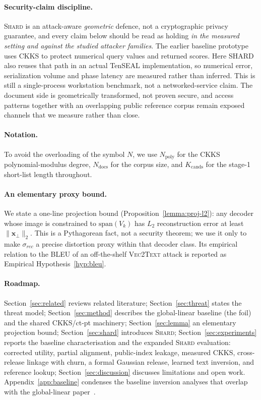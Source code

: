 \paragraph{Security-claim discipline.} \textsc{Shard} is an attack-aware
\emph{geometric} defence, not a cryptographic privacy guarantee, and every
claim below should be read as holding \emph{in the measured setting and
against the studied attacker families}. The earlier baseline prototype uses
CKKS to protect numerical query values and returned scores. Here SHARD also
reuses that path in an actual TenSEAL implementation, so numerical error,
serialization volume and phase latency are measured rather than inferred.
This is still a single-process workstation benchmark, not a networked-service
claim. The document side is geometrically transformed, not proven secure, and
access patterns together with an overlapping public reference corpus remain
exposed channels that we measure rather than close.

\paragraph{Notation.} To avoid the overloading of the symbol $N$, we use
$N_{\mathrm{poly}}$ for the CKKS polynomial-modulus degree,
$N_{\mathrm{docs}}$ for the corpus size, and $K_{\mathrm{cands}}$ for the
stage-1 short-list length throughout.

\paragraph{An elementary proxy bound.} We state a one-line projection
bound (Proposition~\ref{lemma:proj-l2}): any decoder whose image is
constrained to $\mathrm{span}(V_k)$ has $L_2$ reconstruction error at
least $\|\mathbf{x}_\perp\|_2$. This is a Pythagorean fact, not a security
theorem; we use it only to make $\sigma_{rec}$ a precise distortion proxy
within that decoder class. Its empirical relation to the BLEU of an
off-the-shelf \textsc{Vec2Text} attack is reported as Empirical
Hypothesis~\ref{hyp:bleu}.

\paragraph{Roadmap.} Section~\ref{sec:related} reviews related
literature; Section~\ref{sec:threat} states the threat model;
Section~\ref{sec:method} describes the global-linear baseline (the foil)
and the shared CKKS/ct-pt machinery;
Section~\ref{sec:lemma} an elementary projection bound;
Section~\ref{sec:shard} introduces \textsc{Shard};
Section~\ref{sec:experiments} reports the baseline characterisation and the
expanded \textsc{Shard} evaluation: corrected utility, partial alignment,
public-index leakage, measured CKKS, cross-release linkage with churn, a
formal Gaussian release, learned text inversion, and reference lookup;
Section~\ref{sec:discussion} discusses limitations and open work.
Appendix~\ref{app:baseline} condenses the baseline inversion analyses
that overlap with the global-linear paper~\cite{ref_alpha}.

